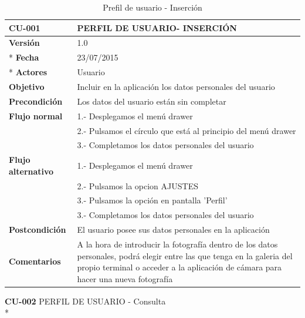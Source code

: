 \documentclass[../pfc.tex]{subfiles}
\begin{document}
	\begin{table}[H]
		\centering
		\begin{tabular}[t]{|p{3cm}|p{9.5cm}|}
				\hline \textbf{CU-001} & \textbf{PERFIL DE USUARIO- INSERCIÓN} \\*
				\hline\hline \textbf{Versión} & 1.0 \\ *
				\hline\hline \textbf{Fecha} & 23/07/2015 \\ *
				\hline\textbf{Actores} 	& Usuario\\*
				\hline \textbf{Objetivo} & Incluir en la aplicación los datos personales del usuario\\* 			
				\hline \textbf{Precondición} & Los datos del usuario están sin completar \\* 
				\hline \textbf{Flujo normal} & 1.- Desplegamos el menú drawer \\* 
											 & 2.- Pulsamos el círculo que está al principio del menú drawer \\*	
											 & 3.- Completamos los datos personales del usuario\\*	
				\hline \textbf{Flujo alternativo} & 1.- Desplegamos el menú drawer \\* 
 												  & 2.- Pulsamos la opcion AJUSTES \\*	
												  & 3.- Pulsamos la opción en pantalla 'Perfil' \\*	
												  & 3.- Completamos los datos personales del usuario \\*	
				\hline \textbf{Postcondición} & El usuario posee sus datos personales en la aplicación \\* 
				\hline \textbf{Comentarios}   & A la hora de introducir la fotografía dentro de los datos personales, podrá elegir entre las que tenga en la galeria del propio terminal o acceder a la aplicación de cámara para hacer una nueva fotografía\\*
				\hline
			\end{tabular}
			\caption{Prefil de usuario - Inserción}
			\label{tabla:caso001}
	\end{table}
		
	\textbf{CU-002}	PERFIL DE USUARIO - Consulta\\*
	
\end{document}
